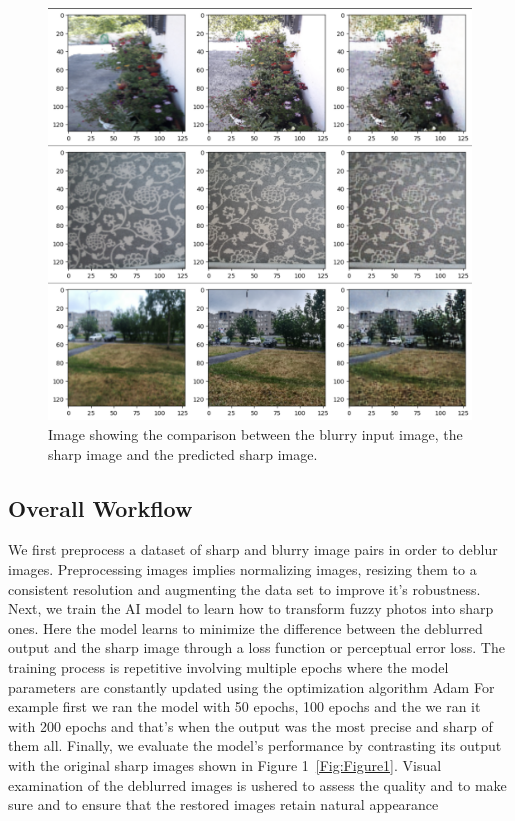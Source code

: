 \documentclass[conference]{IEEEtran}
\begin{document}
\begin{figure}[!ht]
\centering
 \includegraphics[width=\textwidth]{Figures/Figure2.png}
\caption{Image showing the comparison between the blurry input image, the sharp image and the predicted sharp image.}
\label{Fig:Figure2}
\end{figure}

\subsection{Overall Workflow}
We first preprocess a dataset of sharp and blurry image pairs in order to deblur images.
Preprocessing images implies normalizing images, resizing them to a consistent resolution and augmenting the data set to improve it's robustness.
Next, we train the AI model to learn how to transform fuzzy photos into sharp ones. 
Here the model learns to minimize the difference between the deblurred output and the sharp image through a loss function or perceptual error loss.
The training process is repetitive involving multiple epochs where the model parameters are constantly updated using the optimization algorithm Adam
For example first we ran the model with 50 epochs, 100 epochs and the we ran it with 200 epochs and that's when the output was the most precise and sharp of them all.
Finally, we evaluate the model's performance by contrasting its output with the original sharp images shown in Figure 1~\ref{Fig:Figure1}.
Visual examination of the deblurred images is ushered to assess the quality and to make sure and to ensure that the restored images retain natural appearance
\end{document}
